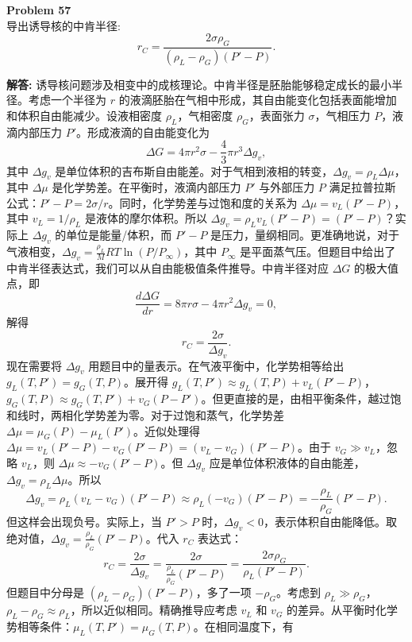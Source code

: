 \documentclass[12pt, a4paper, oneside]{ctexart}
\newenvironment{solution}{\par\noindent\textbf{解答:}\quad}{\par}
\begin{document}
\begin{mdframed}[backgroundcolor=gray!10, linewidth=0pt]
    \textbf{Problem 57} \\
    导出诱导核的中肯半径:
    \[
    r_C = \frac{2\sigma \rho_G}{(\rho_L - \rho_G)(P' - P)}.
    \]
\end{mdframed}
\begin{solution}
    诱导核问题涉及相变中的成核理论。中肯半径是胚胎能够稳定成长的最小半径。考虑一个半径为 $r$ 的液滴胚胎在气相中形成，其自由能变化包括表面能增加和体积自由能减少。设液相密度 $\rho_L$，气相密度 $\rho_G$，表面张力 $\sigma$，气相压力 $P$，液滴内部压力 $P'$。形成液滴的自由能变化为
    \[
    \Delta G = 4\pi r^2 \sigma - \frac{4}{3}\pi r^3 \Delta g_v,
    \]
    其中 $\Delta g_v$ 是单位体积的吉布斯自由能差。对于气相到液相的转变，$\Delta g_v = \rho_L \Delta \mu$，其中 $\Delta \mu$ 是化学势差。在平衡时，液滴内部压力 $P'$ 与外部压力 $P$ 满足拉普拉斯公式：$P' - P = 2\sigma / r$。同时，化学势差与过饱和度的关系为 $\Delta \mu = v_L (P' - P)$，其中 $v_L = 1/\rho_L$ 是液体的摩尔体积。所以 $\Delta g_v = \rho_L v_L (P' - P) = (P' - P)$？实际上 $\Delta g_v$ 的单位是能量/体积，而 $P' - P$ 是压力，量纲相同。更准确地说，对于气液相变，$\Delta g_v = \frac{\rho_L}{M} RT \ln(P/P_\infty)$，其中 $P_\infty$ 是平面蒸气压。但题目中给出了中肯半径表达式，我们可以从自由能极值条件推导。中肯半径对应 $\Delta G$ 的极大值点，即
    \[
    \frac{d\Delta G}{dr} = 8\pi r \sigma - 4\pi r^2 \Delta g_v = 0,
    \]
    解得
    \[
    r_C = \frac{2\sigma}{\Delta g_v}.
    \]
    现在需要将 $\Delta g_v$ 用题目中的量表示。在气液平衡中，化学势相等给出 $g_L(T, P') = g_G(T, P)$。展开得 $g_L(T, P') \approx g_L(T, P) + v_L (P' - P)$，$g_G(T, P) \approx g_G(T, P') + v_G (P - P')$。但更直接的是，由相平衡条件，越过饱和线时，两相化学势差为零。对于过饱和蒸气，化学势差 $\Delta \mu = \mu_G(P) - \mu_L(P')$。近似处理得 $\Delta \mu = v_L (P' - P) - v_G (P' - P) = (v_L - v_G)(P' - P)$。由于 $v_G \gg v_L$，忽略 $v_L$，则 $\Delta \mu \approx -v_G (P' - P)$。但 $\Delta g_v$ 应是单位体积液体的自由能差，$\Delta g_v = \rho_L \Delta \mu$。所以
    \[
    \Delta g_v = \rho_L (v_L - v_G)(P' - P) \approx \rho_L (-v_G)(P' - P) = -\frac{\rho_L}{\rho_G} (P' - P).
    \]
    但这样会出现负号。实际上，当 $P' > P$ 时，$\Delta g_v < 0$，表示体积自由能降低。取绝对值，$\Delta g_v = \frac{\rho_L}{\rho_G} (P' - P)$。代入 $r_C$ 表达式：
    \[
    r_C = \frac{2\sigma}{\Delta g_v} = \frac{2\sigma}{\frac{\rho_L}{\rho_G} (P' - P)} = \frac{2\sigma \rho_G}{\rho_L (P' - P)}.
    \]
    但题目中分母是 $(\rho_L - \rho_G)(P' - P)$，多了一项 $-\rho_G$。考虑到 $\rho_L \gg \rho_G$，$\rho_L - \rho_G \approx \rho_L$，所以近似相同。精确推导应考虑 $v_L$ 和 $v_G$ 的差异。从平衡时化学势相等条件：$\mu_L(T, P') = \mu_G(T, P)$。在相同温度下，有

\end{solution}
\end{document}
